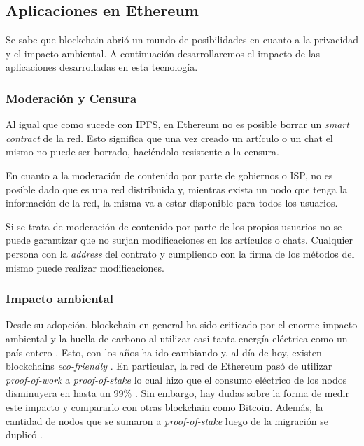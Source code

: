 \subsection{Aplicaciones en Ethereum}

Se sabe que blockchain abrió un mundo de posibilidades en cuanto a la privacidad y el impacto ambiental. A continuación desarrollaremos el impacto de las aplicaciones desarrolladas en esta tecnología.

\subsubsection{Moderación y Censura}

Al igual que como sucede con IPFS, en Ethereum no es posible borrar un \textit{smart contract} de la red. Esto significa que una vez creado un artículo o un chat el mismo no puede ser borrado, haciéndolo resistente a la censura.

En cuanto a la moderación de contenido por parte de gobiernos o ISP, no es posible dado que es una red distribuida y, mientras exista un nodo que tenga la información de la red, la misma va a estar disponible para todos los usuarios.

Si se trata de moderación de contenido por parte de los propios usuarios no se puede garantizar que no surjan modificaciones en los artículos o chats. Cualquier persona con la \textit{address} del contrato y cumpliendo con la firma de los métodos del mismo puede realizar modificaciones.

\subsubsection{Impacto ambiental}

Desde su adopción, blockchain en general ha sido criticado por el enorme impacto ambiental y la huella de carbono al utilizar casi tanta energía eléctrica como un país entero \cite{ethereum-honduras}. Esto, con los años ha ido cambiando y, al día de hoy, existen blockchains \textit{eco-friendly} \cite{blockchain-eco-friendly}. En particular, la red de Ethereum pasó de utilizar \textit{proof-of-work} a \textit{proof-of-stake} lo cual hizo que el consumo eléctrico de los nodos disminuyera en hasta un 99\% \cite{ethereum-green}. Sin embargo, hay dudas sobre la forma de medir este impacto y compararlo con otras blockchain como Bitcoin. Además, la cantidad de nodos que se sumaron a \textit{proof-of-stake} luego de la migración se duplicó \cite{ethereum-pos}.
